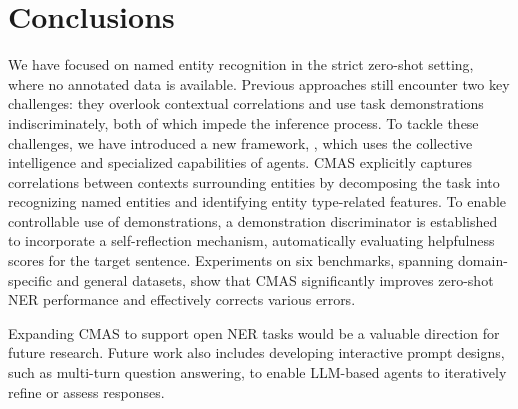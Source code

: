 \section{Conclusions}
We have focused on named entity recognition in the strict zero-shot setting, where no annotated data is available. Previous approaches still encounter two key challenges: they overlook contextual correlations and use task demonstrations indiscriminately, both of which impede the inference process. To tackle these challenges, we have introduced a new framework, , which uses the collective intelligence and specialized capabilities of agents. \ac{CMAS} explicitly captures correlations between contexts surrounding entities by decomposing the task into recognizing named entities and identifying entity type-related features. 
To enable controllable use of demonstrations, a demonstration discriminator is established to incorporate a self-reflection mechanism, automatically evaluating helpfulness scores for the target sentence. 
Experiments on six benchmarks, spanning domain-specific and general datasets, show that \ac{CMAS} significantly improves zero-shot \ac{NER} performance and effectively corrects various errors.

Expanding \ac{CMAS} to support open \ac{NER} tasks would be a valuable direction for future research. Future work also includes developing interactive prompt designs, such as multi-turn question answering, to enable LLM-based agents to iteratively refine or assess responses.


